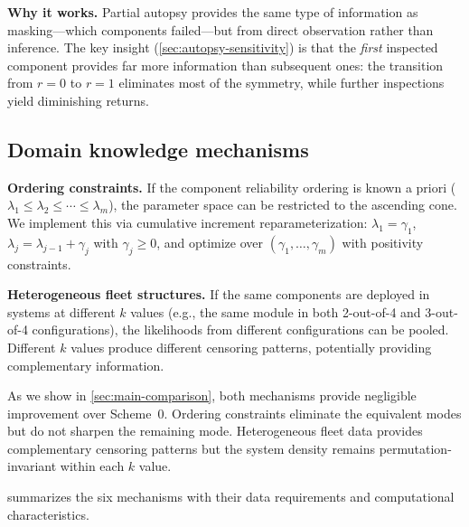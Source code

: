 \documentclass[12pt]{article}
\begin{document}
\textbf{Why it works.}
Partial autopsy provides the same type of information as masking---which
components failed---but from direct observation rather than inference.
The key insight (\cref{sec:autopsy-sensitivity}) is that the \emph{first}
inspected component provides far more information than subsequent ones:
the transition from $r = 0$ to $r = 1$ eliminates most of the symmetry,
while further inspections yield diminishing returns.

\subsection{Domain knowledge mechanisms}\label{sec:domain}

\textbf{Ordering constraints.}
If the component reliability ordering is known a priori
($\lambda_1 \leq \lambda_2 \leq \cdots \leq \lambda_m$), the parameter
space can be restricted to the ascending cone.  We implement this via
cumulative increment reparameterization: $\lambda_1 = \gamma_1$,
$\lambda_j = \lambda_{j-1} + \gamma_j$ with $\gamma_j \geq 0$, and
optimize over $(\gamma_1, \ldots, \gamma_m)$ with positivity constraints.

\textbf{Heterogeneous fleet structures.}
If the same components are deployed in systems at different $k$ values
(e.g., the same module in both 2-out-of-4 and 3-out-of-4
configurations), the likelihoods from different configurations can be
pooled.  Different $k$ values produce different censoring patterns,
potentially providing complementary information.

As we show in \cref{sec:main-comparison}, both mechanisms provide
negligible improvement over Scheme~0.  Ordering constraints eliminate
the equivalent modes but do not sharpen the remaining mode.
Heterogeneous fleet data provides complementary censoring patterns but
the system density remains permutation-invariant within each $k$ value.

 summarizes the six mechanisms with their data
requirements and computational characteristics.
\end{document}
